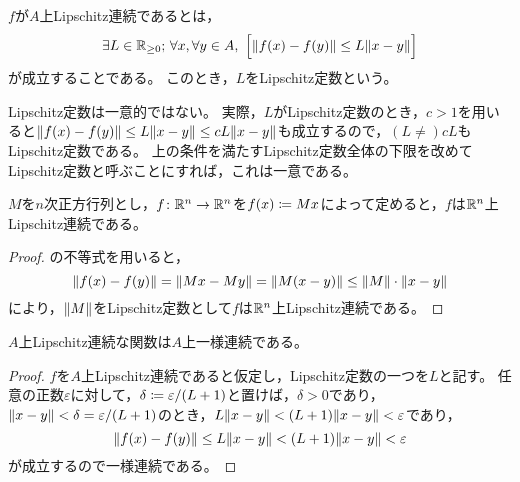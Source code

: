 \documentclass[b5paper,draft]{ltjsbook}
\begin{document}
\begin{defi}[Lipschitz連続性]
    $f$が$A$上Lipschitz連続であるとは，
    \begin{equation}
        \exists L\in \Rnonnega;\, \forall x, \forall y \in A,\ \bsqu{
            \norm{\fun{f}{x}-\fun{f}{y}}\leq L \norm{x - y}
        }
    \end{equation}
    が成立することである。
    このとき，$L$をLipschitz定数という。
\end{defi}

\begin{rem}
    Lipschitz定数は一意的ではない。
    実際，$L$がLipschitz定数のとき，$c>1$を用いると$\norm{\fun{f}{x}-\fun{f}{y}}\leq L \norm{x - y}\leq cL \norm{x-y}$も成立するので，$(L\neq )cL$もLipschitz定数である。
    上の条件を満たすLipschitz定数全体の下限を改めてLipschitz定数と呼ぶことにすれば，これは一意である。
\end{rem}

\begin{eg}
    $M$を$n$次正方行列とし，$f\colon \mathbb{R}^n\to \mathbb{R}^n$を$\fun{f}{x}\coloneqq Mx$によって定めると，$f$は$\mathbb{R}^n$上Lipschitz連続である。
    \begin{proof}
        の不等式を用いると，
        \begin{equation}
            \norm{\fun{f}{x}-\fun{f}{y}}
            =\norm{Mx-My}
            =\norm{M\pare{x-y}}
            \leq \norm{M}\cdot \norm{x-y}
        \end{equation}
        により，$\norm{M}$をLipschitz定数として$f$は$\mathbb{R}^n$上Lipschitz連続である。
    \end{proof}
\end{eg}


\begin{prop}
    $A$上Lipschitz連続な関数は$A$上一様連続である。
    \begin{proof}
        $f$を$A$上Lipschitz連続であると仮定し，Lipschitz定数の一つを$L$と記す。
        任意の正数$\varepsilon$に対して，$\delta \coloneqq \varepsilon / \pare{L+1}$と置けば，$\delta >0$であり，$\norm{x-y}<\delta = {\varepsilon}/\pare{L+1}$のとき，$L\norm{x-y}<\pare{L+1}\norm{x-y}<\varepsilon$であり，
        \begin{equation}
            \norm{\fun{f}{x} - \fun{f}{y}} \leq L \norm{x - y}<\pare{L+1}\norm{x-y}<\varepsilon
        \end{equation}
        が成立するので一様連続である。
    \end{proof}
\end{prop}
\end{document}
